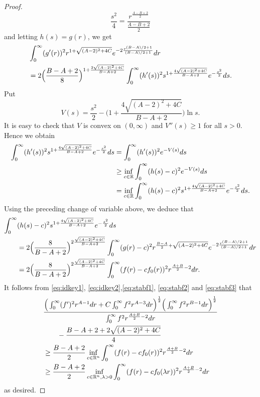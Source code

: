\documentclass[a4paper,12pt]{article}
\theoremstyle{plain}
\theoremstyle{definition}
\theoremstyle{remark}
\def\R{\mathbb R}%
\numberwithin{equation}{section}
\begin{document}
\begin{proof}
\[
\frac{s^2}4 = \frac{r^{\frac{A-B+2}2}}{\frac{A-B+2}2}
\]
and letting $h(s) = g(r)$, we get
\begin{align}\label{eq:stabf1}
&\int_0^\infty(g'(r))^2 r^{1 + \sqrt{(A-2)^2 + 4 C}} e^{-2\frac{r^{(B-A)/2 +1}}{(B-A)/2 +1}} dr\notag\\
& = 2\Big(\frac{B-A+2}8\Big)^{1 + \frac{2\sqrt{(A-2)^2 +4C}}{B-A+2}} \int_0^\infty (h'(s))^2 s^{1 + \frac{4\sqrt{(A-2)^2 +4C}}{B-A+2}} e^{-\frac{s^2}2} ds.
\end{align}
Put 
\[
V(s) = \frac{s^2}2 - \big(1 + \frac{4\sqrt{(A-2)^2 +4C}}{B-A+2}\big) \ln s.
\]
It is easy to check that $V$ is convex on $(0,\infty)$ and $V''(s) \geq 1$ for all $s > 0$. Hence we obtain 
\begin{align}\label{eq:stabf2}
\int_0^\infty (h'(s))^2 s^{1 + \frac{4\sqrt{(A-2)^2 +4C}}{B-A+2}} e^{-\frac{s^2}2} ds & = \int_0^\infty (h'(s))^2 e^{-V(s)} ds\notag\\
&\geq \inf_{c\in \R} \int_0^\infty (h(s) -c)^2 e^{-V(s)} ds\notag\\
&= \inf_{c\in \R}\int_0^\infty (h(s)-c)^2 s^{1 + \frac{4\sqrt{(A-2)^2 +4C}}{B-A+2}} e^{-\frac{s^2}2} ds.
\end{align}
Using the preceding change of variable above, we deduce that
\begin{align}\label{eq:stabf3}
\int_0^\infty &(h(s)-c)^2 s^{1 + \frac{4\sqrt{(A-2)^2 +4C}}{B-A+2}} e^{-\frac{s^2}2} ds\notag\\
& = 2\Big(\frac8{B-A+2}\Big)^{2\frac{\sqrt{(A-2)^2 +4C}}{B-A+2}}\int_0^\infty(g(r) -c)^2 r^{\frac{B-A}2 + \sqrt{(A-2)^2 + 4C}} e^{-2 \frac{r^{(B-A)/2+1}}{(B-A)/2 +1}} dr\notag\\
& = 2\Big(\frac8{B-A+2}\Big)^{2\frac{\sqrt{(A-2)^2 +4C}}{B-A+2}}\int_0^\infty (f(r) - c f_0(r))^2 r^{\frac{A+B}2 -2} dr. 
\end{align}
It follows from \eqref{eq:idkey1}, \eqref{eq:idkey2},\eqref{eq:stabf1}, \eqref{eq:stabf2} and \eqref{eq:stabf3} that
\begin{align*}
&\frac{\Big(\int_0^\infty (f')^2 r^{A -1} dr + C \int_0^\infty f^2 r^{A -3} dr\Big)^{\frac12}\Big( \int_0^\infty f^2 r^{B-1} dr\Big)^{\frac12}}{\int_0^\infty f^2 r^{\frac{A+B}2-2} dr}\notag\\
&\qquad -  \frac{B-A+2 + 2\sqrt{(A-2)^2 + 4C}}4\notag\\
&\geq \frac{B-A+2}2 \inf_{c\in\R^n} \int_0^\infty (f(r) - c f_0(r))^2 r^{\frac{A+B}2 -2} dr\notag\\
&\geq \frac{B-A+2}2 \inf_{c\in\R^n, \lambda > 0} \int_0^\infty (f(r) - c f_0(\lambda r))^2 r^{\frac{A+B}2 -2} dr
\end{align*}
as desired.
\end{proof}
\end{document}
